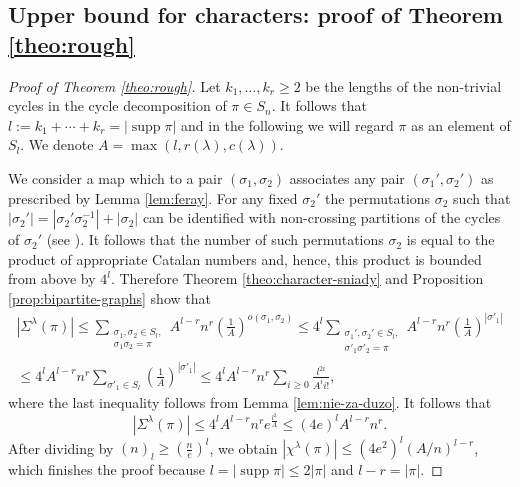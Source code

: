 \documentclass[12pt]{amsart}
\theoremstyle{plain}
\theoremstyle{remark}
\newcommand{\balanced}{D}
\DeclareMathOperator{\supp}{supp}
\begin{document}
\subsection{Upper bound for characters: proof of Theorem \ref{theo:rough}}
\begin{proof}[Proof of Theorem \ref{theo:rough}]
Let $k_1,\dots,k_r\geq 2$ be the lengths of the non-trivial cycles in the cycle
decomposition of $\pi\in S_n$.
It follows that $l:=k_1+\cdots+k_r=|\supp \pi|$ and in the following we will regard $\pi$ as an element of
$S_l$. We denote $A=\max(l,r(\lambda),c(\lambda))$.

We consider a map which to a pair $(\sigma_1,\sigma_2)$ associates any pair 
$(\sigma_1',\sigma_2')$ as prescribed by Lemma \ref{lem:feray}. For any 
fixed $\sigma_2'$ the
permutations $\sigma_2$ such that $|\sigma_2'|= |\sigma_2'\sigma_2^{-1} |+|\sigma_2|$
can be identified with non-crossing partitions of the cycles of $\sigma_2'$ 
(see \cite[Section 1.3]{Biane1997}).  It follows that the number of such permutations
$\sigma_2$ is equal to the product of appropriate Catalan numbers and, hence, this product is bounded from above by $4^{l}$. Therefore Theorem \ref{theo:character-sniady} and Proposition \ref{prop:bipartite-graphs} show that
\begin{multline*}
|\Sigma^{\lambda}(\pi) | \leq
\sum_{\substack{\sigma_1,\sigma_2\in S_l,\\ \sigma_1 \sigma_2=\pi}} A^{l-r} n^r \left(\frac{1}{A}\right)^{o(\sigma_1,\sigma_2)} \leq
4^l \sum_{\substack{\sigma_1',\sigma_2'\in S_l, \\ \sigma'_1 \sigma'_2=\pi}} A^{l-r} n^r \left(\frac{1}{A}\right)^{|\sigma'_1|}\\
\leq 4^l A^{l-r} n^r \sum_{\sigma'_1\in S_l} \left(\frac{1}{A}\right)^{|\sigma'_1|} \leq
4^l A^{l-r} n^r \sum_{i \geq 0} \frac{l^{2i}}{A^i i!},
\end{multline*}
where the last inequality follows from Lemma \ref{lem:nie-za-duzo}. It follows that
\begin{equation}
|\Sigma^{\lambda}(\pi) | \leq  4^l A^{l-r} n^r e^{\frac{l^2}{A}} \leq (4e)^l A^{l-r} n^r. 
\end{equation}
After dividing by $(n)_l \geq \left(\frac{n}{e}\right)^l$, we obtain $|\chi^{\lambda}(\pi) | \leq (4 e^2)^l (A/n)^{l-r}$,
which finishes the proof because $l=|\supp \pi| \leq 2|\pi|$ and $l-r=|\pi|$.
\end{proof}


\end{document}

